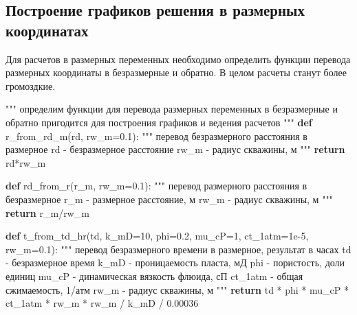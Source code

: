 \documentclass[
  russian,
  letterpaper,
  DIV=11,
  numbers=noendperiod,
  oneside]{scrartcl}
\newenvironment{Shaded}{\begin{snugshade}}{\end{snugshade}}
\newcommand{\CommentTok}[1]{\textcolor[rgb]{0.37,0.37,0.37}{#1}}
\newcommand{\ControlFlowTok}[1]{\textcolor[rgb]{0.00,0.23,0.31}{\textbf{#1}}}
\newcommand{\DecValTok}[1]{\textcolor[rgb]{0.68,0.00,0.00}{#1}}
\newcommand{\FloatTok}[1]{\textcolor[rgb]{0.68,0.00,0.00}{#1}}
\newcommand{\KeywordTok}[1]{\textcolor[rgb]{0.00,0.23,0.31}{\textbf{#1}}}
\newcommand{\NormalTok}[1]{\textcolor[rgb]{0.00,0.23,0.31}{#1}}
\newcommand{\OperatorTok}[1]{\textcolor[rgb]{0.37,0.37,0.37}{#1}}
\begin{document}
\subsection{Построение графиков решения в размерных
координатах}\label{ux43fux43eux441ux442ux440ux43eux435ux43dux438ux435-ux433ux440ux430ux444ux438ux43aux43eux432-ux440ux435ux448ux435ux43dux438ux44f-ux432-ux440ux430ux437ux43cux435ux440ux43dux44bux445-ux43aux43eux43eux440ux434ux438ux43dux430ux442ux430ux445}

Для расчетов в размерных переменных необходимо определить функции
перевода размерных координаты в безразмерные и обратно. В целом расчеты
станут более громоздкие.

\begin{Shaded}
\begin{Highlighting}[]
\CommentTok{"""}
\CommentTok{ определим функции для перевода размерных переменных в безразмерные и обратно}
\CommentTok{ пригодится для построения графиков и ведения расчетов}
\CommentTok{"""}
\KeywordTok{def}\NormalTok{ r\_from\_rd\_m(rd, rw\_m}\OperatorTok{=}\FloatTok{0.1}\NormalTok{):}
    \CommentTok{"""}
\CommentTok{    перевод безразмерного расстояния в размерное}
\CommentTok{    rd {-}  безразмерное расстояние}
\CommentTok{    rw\_m {-}  радиус скважины, м}
\CommentTok{    """}
    \ControlFlowTok{return}\NormalTok{ rd}\OperatorTok{*}\NormalTok{rw\_m}

\KeywordTok{def}\NormalTok{ rd\_from\_r(r\_m, rw\_m}\OperatorTok{=}\FloatTok{0.1}\NormalTok{):}
    \CommentTok{"""}
\CommentTok{    перевод размерного расстояния в безразмерное}
\CommentTok{    r\_m {-} размерное расстояние, м}
\CommentTok{    rw\_m {-} радиус скважины, м}
\CommentTok{    """}
    \ControlFlowTok{return}\NormalTok{ r\_m}\OperatorTok{/}\NormalTok{rw\_m}

\KeywordTok{def}\NormalTok{ t\_from\_td\_hr(td, k\_mD}\OperatorTok{=}\DecValTok{10}\NormalTok{, phi}\OperatorTok{=}\FloatTok{0.2}\NormalTok{, mu\_cP}\OperatorTok{=}\DecValTok{1}\NormalTok{, ct\_1atm}\OperatorTok{=}\FloatTok{1e{-}5}\NormalTok{, rw\_m}\OperatorTok{=}\FloatTok{0.1}\NormalTok{):}
    \CommentTok{"""}
\CommentTok{    перевод безразмерного времени в размерное, результат в часах}
\CommentTok{    td {-} безразмерное время}
\CommentTok{    k\_mD {-} проницаемость пласта, мД}
\CommentTok{    phi {-} пористость, доли единиц}
\CommentTok{    mu\_cP {-} динамическая вязкость флюида, сП}
\CommentTok{    ct\_1atm {-} общая сжимаемость, 1/атм}
\CommentTok{    rw\_m {-} радиус скважины, м}
\CommentTok{    """}
    \ControlFlowTok{return}\NormalTok{ td }\OperatorTok{*}\NormalTok{ phi }\OperatorTok{*}\NormalTok{ mu\_cP }\OperatorTok{*}\NormalTok{ ct\_1atm }\OperatorTok{*}\NormalTok{ rw\_m }\OperatorTok{*}\NormalTok{ rw\_m }\OperatorTok{/}\NormalTok{ k\_mD }\OperatorTok{/} \FloatTok{0.00036}


\end{Highlighting}
\end{Shaded}
\end{document}
